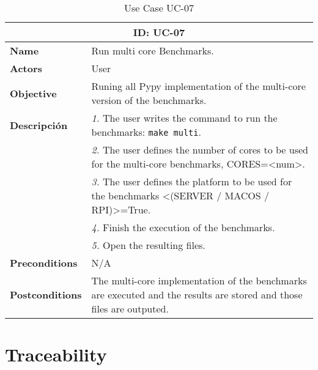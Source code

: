 \begin{table}[H]
    \centering
    \begin{tabular}{l p{10cm}}
        \toprule
        \multicolumn{2}{c}{\textbf{ID: UC-07}} \\
        \toprule
        \textbf{Name}                         &  Run multi core Benchmarks. \\
        \textbf{Actors}                       &  User \\
        \textbf{Objective}                    &  Runing all Pypy implementation of the multi-core version of the benchmarks. \\
        \multirow{1}{*}{\textbf{Descripción}} & \textsl{1.} The user writes the command to run the benchmarks: \texttt{make multi}.\\
                                              & \textsl{2.} The user defines the number of cores to be used for the multi-core benchmarks, CORES=<num>.\\
                                              & \textsl{3.} The user defines the platform to be used for the benchmarks <(SERVER / MACOS / RPI)>=True.\\
                                              & \textsl{4.} Finish the execution of the benchmarks.\\
                                              & \textsl{5.} Open the resulting files.\\ 
        \textbf{Preconditions}                &  N/A \\
        \textbf{Postconditions}               &  The multi-core implementation of the benchmarks are executed and the results are stored and those files are outputed. \\
    \end{tabular}
    \caption{Use Case UC-07}
    \label{tab:uc-07}
\end{table}



\section{Traceability}
